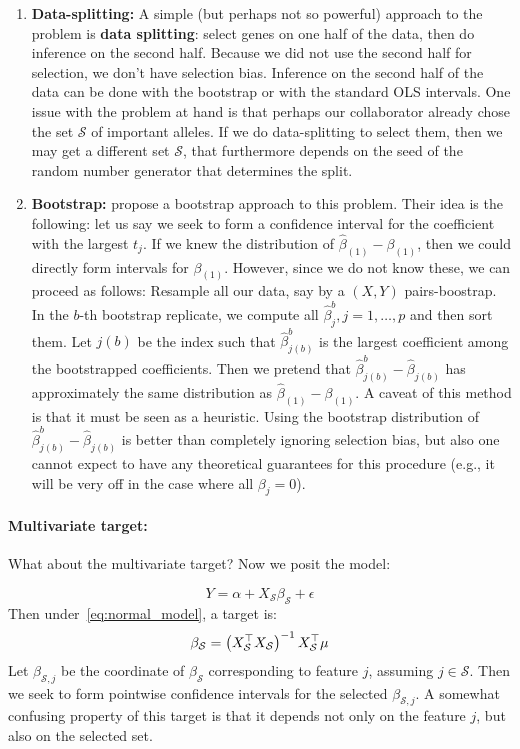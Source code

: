 \begin{enumerate}
	\item {\bf Data-splitting:} A simple (but perhaps not so powerful) approach to the problem is {\bf data splitting}: select genes on one half of the data, then do inference on the second half. Because we did not use the second half for selection, we don't have selection bias. Inference on the second half of the data can be done with the bootstrap or with the standard OLS intervals. One issue with the problem at hand is that perhaps our collaborator already chose the set $\mathcal{S}$ of important alleles. If we do data-splitting to select them, then we may get a different set $\mathcal{S}$, that furthermore depends on the seed of the random number generator that determines the split. 

	\item {\bf Bootstrap:} \citet{morrison2018rank} propose a bootstrap approach to this problem. Their idea is the following: let us say we seek to form a confidence interval for the coefficient with the largest $t_j$. If we knew the distribution of $\hat{\beta}_{(1)} - \beta_{(1)}$, then we could directly form intervals for $\beta_{(1)}$. However, since we do not know these, we can proceed as follows:  Resample all our data, say by a $(X,Y)$ pairs-boostrap. In the $b$-th bootstrap replicate, we compute all $\hat{\beta}_j^b, j=1,\dotsc,p$ and then sort them. Let $j(b)$ be the index such that $\hat{\beta}_{j(b)}^b$ is the largest coefficient among the bootstrapped coefficients. Then we pretend that $\hat{\beta}_{j(b)}^b - \hat{\beta}_{j(b)}$ has approximately the same distribution as $\hat{\beta}_{(1)} - \beta_{(1)}$. A caveat of this method is that it must be seen as a heuristic. Using the bootstrap distribution of  $\hat{\beta}_{j(b)}^b - \hat{\beta}_{j(b)}$ is better than completely ignoring selection bias, but also one cannot expect to have any theoretical guarantees for this procedure (e.g., it will be very off in the case where all $\beta_j =0$).
	\end{enumerate}

	\paragraph{Multivariate target:}
	What about the multivariate target? Now we posit the model:

	\begin{equation}
	\label{eq:multivariate_model}
	Y = \alpha +  X_{\mathcal{S}}\beta_{\mathcal{S}} + \epsilon
	\end{equation}
	Then under~\eqref{eq:normal_model}, a target is:
	\begin{equation}
	\label{eq:selected_model_target}
	\beta_{\mathcal{S}} = \left(X_{\mathcal{S}}^\top X_{\mathcal{S}}\right)^{-1} X_{\mathcal{S}}^\top \mu
	\end{equation}
	Let $\beta_{\mathcal{S},j}$ be the coordinate of $\beta_{\mathcal{S}}$ corresponding to feature $j$, assuming $j \in \mathcal{S}$. Then we seek to form pointwise confidence intervals for the selected $\beta_{\mathcal{S},j}$. A somewhat confusing property of this target is that it depends not only on the feature $j$, but also on the selected set.

